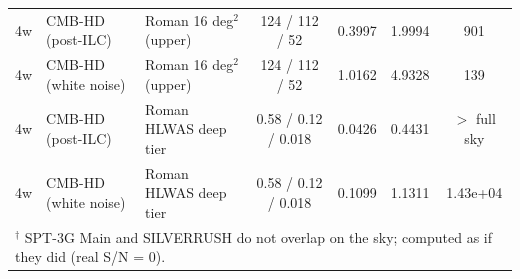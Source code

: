 \begin{tabular}{lllcccc}
4w & CMB-HD (post-ILC) & Roman 16 deg$^2$ (upper) & 124 / 112 / 52 & 0.3997 & 1.9994 & 901 \\
4w & CMB-HD (white noise) & Roman 16 deg$^2$ (upper) & 124 / 112 / 52 & 1.0162 & 4.9328 & 139 \\
4w & CMB-HD (post-ILC) & Roman HLWAS deep tier & 0.58 / 0.12 / 0.018 & 0.0426 & 0.4431 & $>$ full sky \\
4w & CMB-HD (white noise) & Roman HLWAS deep tier & 0.58 / 0.12 / 0.018 & 0.1099 & 1.1311 & 1.43e+04 \\
\bottomrule
\multicolumn{7}{l}{\footnotesize $^\dagger$ SPT-3G Main and SILVERRUSH do not overlap on the sky; computed as if they did (real S/N = 0).} \\
\end{tabular}
